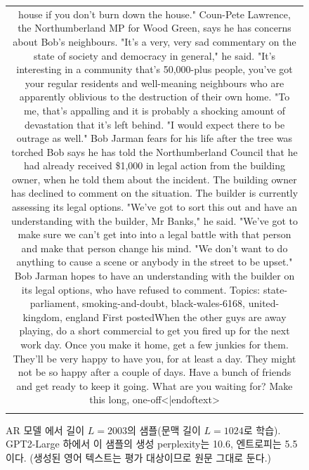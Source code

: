 \begin{figure}[H]
\begin{tabular}{c}
{\begin{minipage}{0.9\textwidth}
house if you don't burn down the house."  Coun-Pete Lawrence, the Northumberland MP for Wood Green, says he has concerns about Bob's neighbours.  "It's a very, very sad commentary on the state of society and democracy in general," he said.  "It's interesting in a community that's 50,000-plus people, you've got your regular residents and well-meaning neighbours who are apparently oblivious to the destruction of their own home.  "To me, that's appalling and it is probably a shocking amount of devastation that it's left behind.  "I would expect there to be outrage as well."  Bob Jarman fears for his life after the tree was torched  Bob says he has told the Northumberland Council that he had already received \$1,000 in legal action from the building owner, when he told them about the incident.  The building owner has declined to comment on the situation.  The builder is currently assessing its legal options.  "We've got to sort this out and have an understanding with the builder, Mr Banks," he said.  "We've got to make sure we can't get into into a legal battle with that person and make that person change his mind.  "We don't want to do anything to cause a scene or anybody in the street to be upset."  Bob Jarman hopes to have an understanding with the builder on its legal options, who have refused to comment.  Topics: state-parliament, smoking-and-doubt, black-wales-6168, united-kingdom, england  First postedWhen the other guys are away playing, do a short commercial to get you fired up for the next work day.  Once you make it home, get a few junkies for them.  They'll be very happy to have you, for at least a day.  They might not be so happy after a couple of days.  Have a bunch of friends and get ready to keep it going.  What are you waiting for? Make this long, one-off<|endoftext>
    \end{minipage}} \\
    \\
       
    \end{tabular}
    \caption{AR 모델 \citep{sahoo2024simple}에서 길이 $L=2003$의 샘플(문맥 길이 $L=1024$로 학습). GPT2-Large 하에서 이 샘플의 생성 perplexity는 10.6, 엔트로피는 5.5이다. (생성된 영어 텍스트는 평가 대상이므로 원문 그대로 둔다.)}
    \label{ar-samples}
\end{figure}

